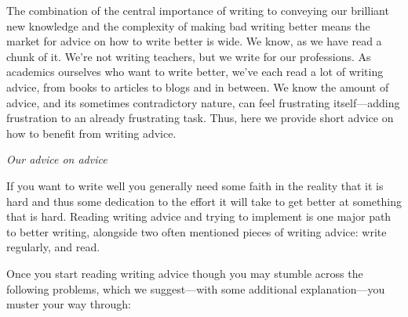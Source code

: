 \documentclass[11pt,letter]{article}
\begin{document}
The combination of the central importance of writing to conveying our brilliant new knowledge and the complexity of making bad writing better means the market for advice on how to write better is wide. We know, as we have read a chunk of it. We’re not writing teachers, but we write for our professions. As academics ourselves who want to write better, we've each read a lot of writing advice, from books to articles to blogs and in between. We know the amount of advice, and its sometimes contradictory nature, can feel frustrating itself---adding frustration to an already frustrating task. Thus, here we provide short advice on how to benefit from writing advice. 

\emph{Our advice on advice}

If you want to write well you generally need some faith in the reality that it is hard and thus some dedication to the effort it will take to get better at something that is hard. Reading writing advice and trying to implement is one major path to better writing, alongside two often mentioned pieces of writing advice: write regularly, and read. 

Once you start reading writing advice though you may stumble across the following problems, which we suggest---with some additional explanation---you muster your way through:
\end{document}
